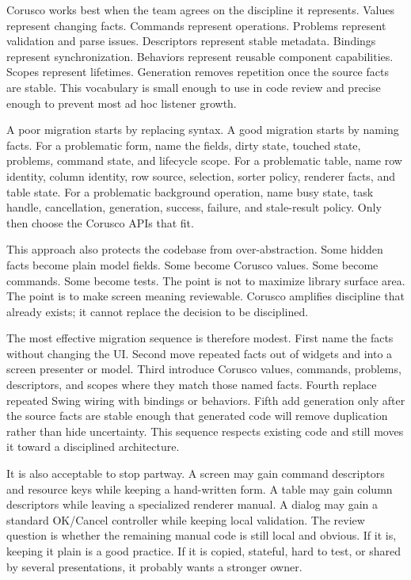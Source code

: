 Corusco works best when the team agrees on the discipline it represents. Values
represent changing facts. Commands represent operations. Problems represent
validation and parse issues. Descriptors represent stable metadata. Bindings
represent synchronization. Behaviors represent reusable component capabilities.
Scopes represent lifetimes. Generation removes repetition once the source facts
are stable. This vocabulary is small enough to use in code review and precise
enough to prevent most ad hoc listener growth.

A poor migration starts by replacing syntax. A good migration starts by naming
facts. For a problematic form, name the fields, dirty state, touched state,
problems, command state, and lifecycle scope. For a problematic table, name row
identity, column identity, row source, selection, sorter policy, renderer facts,
and table state. For a problematic background operation, name busy state, task
handle, cancellation, generation, success, failure, and stale-result policy.
Only then choose the Corusco APIs that fit.

This approach also protects the codebase from over-abstraction. Some hidden
facts become plain model fields. Some become Corusco values. Some become
commands. Some become tests. The point is not to maximize library surface area.
The point is to make screen meaning reviewable. Corusco amplifies discipline
that already exists; it cannot replace the decision to be disciplined.

The most effective migration sequence is therefore modest. First name the
facts without changing the UI. Second move repeated facts out of widgets and
into a screen presenter or model. Third introduce Corusco values, commands, problems,
descriptors, and scopes where they match those named facts. Fourth replace
repeated Swing wiring with bindings or behaviors. Fifth add generation only
after the source facts are stable enough that generated code will remove
duplication rather than hide uncertainty. This sequence respects existing code
and still moves it toward a disciplined architecture.

It is also acceptable to stop partway. A screen may gain command descriptors
and resource keys while keeping a hand-written form. A table may gain column
descriptors while leaving a specialized renderer manual. A dialog may gain a
standard OK/Cancel controller while keeping local validation. The review
question is whether the remaining manual code is still local and obvious. If it
is, keeping it plain is a good practice. If it is copied, stateful, hard to
test, or shared by several presentations, it probably wants a stronger owner.

